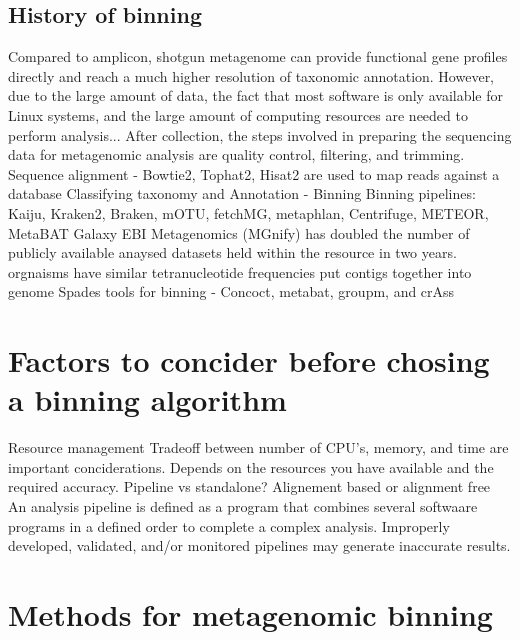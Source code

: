 \documentclass{article}
\begin{document}
\subsection{History of binning}
Compared to amplicon, shotgun metagenome can provide functional gene profiles directly and reach a much higher resolution of taxonomic annotation.
However, due to the large amount of data, the fact that most software is only available for Linux systems, and the large amount of computing resources are needed to perform analysis...
After collection, the steps involved in preparing the sequencing data for metagenomic analysis are quality control, filtering, and trimming.
Sequence alignment - Bowtie2, Tophat2, Hisat2 are used to map reads against a database
Classifying taxonomy and Annotation - Binning
Binning pipelines: Kaiju, Kraken2, Braken, mOTU, fetchMG, metaphlan, Centrifuge, METEOR, MetaBAT
Galaxy
EBI Metagenomics (MGnify) has doubled the number of publicly available anaysed datasets held within the resource in two years.
orgnaisms have similar tetranucleotide frequencies put contigs together into genome
Spades
tools for binning - Concoct, metabat, groupm, and crAss

\section{Factors to concider before chosing a binning algorithm}
Resource management
Tradeoff between number of CPU's, memory, and time are important conciderations.
Depends on the resources you have available and the required accuracy.
Pipeline vs standalone?
Alignement based or alignment free
An analysis pipeline is defined as a program that combines several softwaare programs in a defined order to complete a complex analysis.
Improperly developed, validated, and/or monitored pipelines may generate inaccurate results. 
	
\section{Methods for metagenomic binning}
\end{document}
